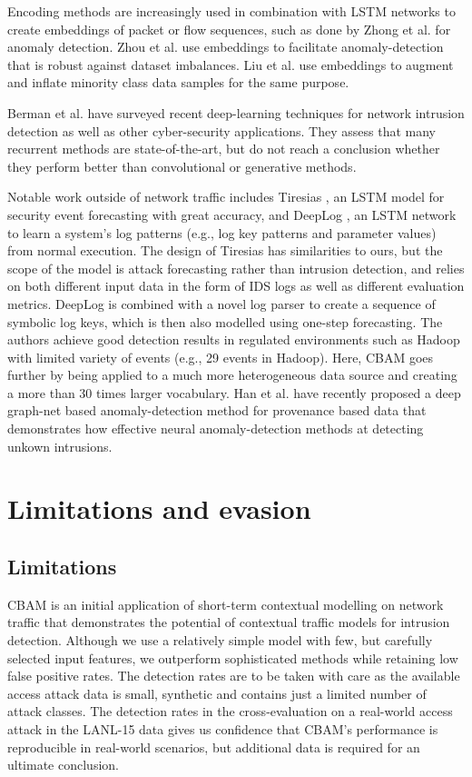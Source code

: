 Encoding methods are increasingly used in combination with LSTM networks to create embeddings of packet or flow sequences, such as done by Zhong et al. \cite{zhong2020helad} for anomaly detection. Zhou et al. \cite{zhou2020variational} use embeddings to facilitate anomaly-detection that is robust against dataset imbalances. Liu et al. \cite{liu2020intrusion} use embeddings to augment and inflate minority class data samples for the same purpose. 

Berman et al. \cite{berman2019survey} have surveyed recent deep-learning techniques for network intrusion detection as well as other cyber-security applications. They assess that many recurrent methods are state-of-the-art, but do not reach a conclusion whether they perform better than convolutional or generative methods.

Notable work outside of network traffic includes Tiresias \cite{shen2018tiresias}, an LSTM model for security event forecasting with great accuracy, 
and DeepLog \cite{du2017deeplog}, an LSTM network to learn a system's log patterns (e.g., log key patterns and parameter values) from normal execution. 
The design of Tiresias has similarities to ours, but the scope of the model is attack forecasting rather than intrusion detection, and relies on both different input data in the form of IDS logs as well as different evaluation metrics. DeepLog is combined with a novel log parser to create a sequence of symbolic log keys, which is then also modelled using one-step forecasting. The authors achieve good detection results in regulated environments such as Hadoop with limited variety of events (e.g., 29 events in Hadoop). Here, CBAM goes further by being applied to a much more heterogeneous data source and creating a more than 30 times larger vocabulary.
Han et al. \cite{han2020unicorn} have recently proposed a deep graph-net based anomaly-detection method for provenance based data that demonstrates  how effective neural anomaly-detection methods at detecting unkown intrusions.


\section{Limitations and evasion}\label{Sec:Resilience}

\subsection{Limitations}\label{Sec:Limitations}

CBAM is an initial application of short-term contextual modelling on network traffic that demonstrates the potential of contextual traffic models for intrusion detection. Although we use a relatively simple model with few, but carefully selected input features, we outperform sophisticated methods while retaining low false positive rates. The detection rates are to be taken with care as the available access attack data is small, synthetic and contains just a limited number of attack classes. The detection rates in the cross-evaluation on a real-world access attack in the LANL-15 data gives us confidence that CBAM's performance is reproducible in real-world scenarios, but additional data is required for an ultimate conclusion. 

